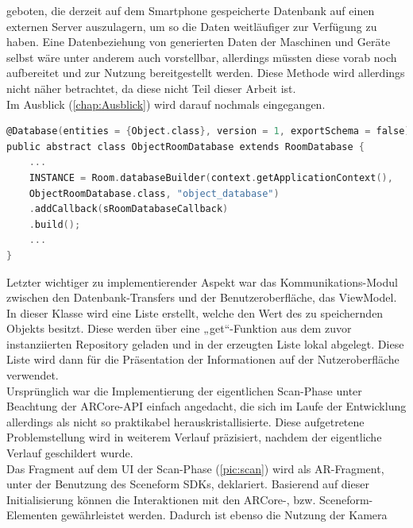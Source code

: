 geboten, die derzeit auf dem Smartphone gespeicherte Datenbank auf einen externen Server auszulagern, um so die Daten weitläufiger zur Verfügung zu haben. 
Eine Datenbeziehung von generierten Daten der Maschinen und Geräte selbst wäre unter anderem auch vorstellbar, allerdings müssten diese vorab noch aufbereitet 
und zur Nutzung bereitgestellt werden. Diese Methode wird allerdings nicht näher betrachtet, da diese nicht Teil dieser Arbeit ist. 
\\ 
Im Ausblick (\ref{chap:Ausblick}) wird darauf nochmals eingegangen.
\\ 
\linebreak
\begin{lstlisting}[language=C,
    frame=lines,           % Ein Rahmen um den Code (single for box, lines for top and bottom)
    xleftmargin=\parindent,  % Rahmen link von den Zahlen
    style=algoBericht,
    label={code:dblayer},
    captionpos=b,           % Caption unter den Code setzen
caption={Erzeugung des Datenbank-Layers „Room“}]
@Database(entities = {Object.class}, version = 1, exportSchema = false)
public abstract class ObjectRoomDatabase extends RoomDatabase {
    ...
    INSTANCE = Room.databaseBuilder(context.getApplicationContext(),
    ObjectRoomDatabase.class, "object_database")
    .addCallback(sRoomDatabaseCallback)
    .build();
    ...
}
\end{lstlisting}
Letzter wichtiger zu implementierender Aspekt war das Kommunikations-Modul zwischen den Datenbank-Transfers und der Benutzeroberfläche, das ViewModel. 
In dieser Klasse wird eine Liste erstellt, welche den Wert des zu speichernden Objekts besitzt. Diese werden über eine „get“-Funktion aus dem zuvor 
instanziierten Repository geladen und in der erzeugten Liste lokal abgelegt. Diese Liste wird dann für die Präsentation der Informationen auf der 
Nutzeroberfläche verwendet. 
\\ 
\linebreak
Ursprünglich war die Implementierung der eigentlichen Scan-Phase unter Beachtung der ARCore-\acs{API} einfach angedacht, die sich im Laufe der Entwicklung 
allerdings als nicht so praktikabel herauskristallisierte. Diese aufgetretene Problemstellung wird in weiterem Verlauf präzisiert, nachdem der eigentliche 
Verlauf geschildert wurde. 
\\ 
Das Fragment auf dem \acl{UI} der Scan-Phase (\ref{pic:scan}) wird als \acs{AR}-Fragment, unter der Benutzung des Sceneform \acs{SDK}s, deklariert. Basierend auf 
dieser Initialisierung können die Interaktionen mit den ARCore-, bzw. Sceneform- Elementen gewährleistet werden. Dadurch ist ebenso die Nutzung der Kamera 
